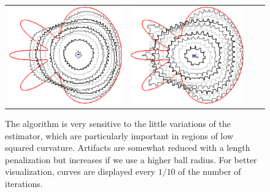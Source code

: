 \begin{figure}
\begin{tabular}{p{2.5em}ccc}
\includegraphics[scale=0.23]{figures/chapter6/radius-effect/flower/improve/len_pen0.5/radius-5/summary.pdf} &
\includegraphics[scale=0.23]{figures/chapter6/radius-effect/flower/improve/len_pen0.5/radius-9/summary.pdf}
\end{tabular}

\caption{ The algorithm is very sensitive to the little variations of the estimator, which are particularly important in regions of low squared curvature. Artifacts are somewhat reduced with a length penalization but increases if we use a higher ball radius. For better visualization, curves are displayed every $1/10$ of the number of iterations. }
\label{ch6:fig:m1-square-flow}
\end{figure}


